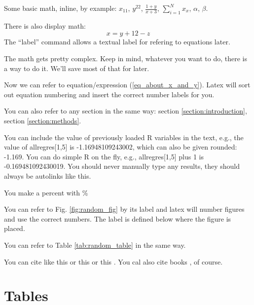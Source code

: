 \documentclass[letterpaper,11pt]{article}
\begin{document}
Some basic math, inline, by example: $x_{11}$, $y^{22}$, $\frac{1+y}{x+3}$, $\sum_{i=1}^N x_x$,
$\alpha$, $\beta$.

There is also display math:
\begin{equation}
x=y+12-z \label{eq_about_x_and_y}
\end{equation}
The ``label'' command allows a textual label for refering to equations later.

The math gets pretty complex. Keep in mind, whatever you want to do, there is a way to do it. We'll save most of that for later.

Now we can refer to equation/expression (\ref{eq_about_x_and_y}). Latex will sort
out equation numbering and insert the correct number labels for you.

You can also refer to any section in the same way: section \ref{section:introduction}, section \ref{section:methods}.

You can include the value of previously loaded R variables in the text, e.g., the value of allregres[1,5] is
-1.16948109243002, which can also be given rounded: -1.169. You can do simple R
on the fly, e.g., allregres[1,5] plus 1 is -0.169481092430019. 
You should never manually type any results, they should always be autolinks like this.


You make a percent with \%

You can refer to Fig. \ref{fig:random_fig} by its label and latex will number figures and use the correct numbers.
The label is defined below where the figure is placed.

You can refer to Table \ref{tab:random_table} in the same way.


You can cite like this \cite{Abanetal2006} or this \citep{Abanetal2006} or this \citealp{Abanetal2006}.
You cal also cite books \citep{BurnhamAnderson2002}, of course.

\clearpage
\newpage




\clearpage
\newpage

\section{Tables}
\end{document}
